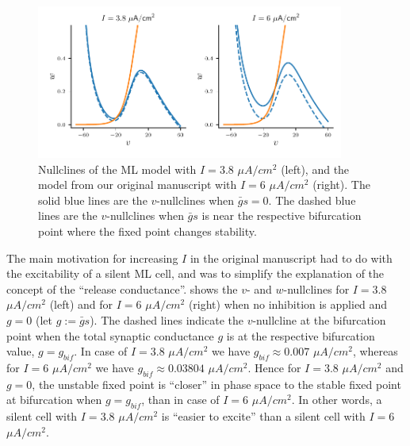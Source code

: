 \documentclass[utf8]{article}
\newcounter{point}[section]
\begin{document}
\begin{figure}[h!]
	\centering
	\includegraphics[width=0.9\textwidth]{model-changes}
	\caption{Nullclines of the \cite{bose2011} ML model with $I=3.8$ $\si{\mu A/cm^2}$ (left), and the model from our original manuscript with $I=6$ $\si{\mu A/cm^2}$ (right). The solid blue lines are the $v$-nullclines when $\bar g s=0$. The dashed blue lines are the $v$-nullclines when $\bar g s$ is near the respective bifurcation point where the fixed point changes stability.\label{fig:nullclines}}
\end{figure}

The main motivation for increasing $I$ in the original manuscript had to do with the excitability of a silent ML cell, and was to simplify the explanation of the concept of the ``release conductance''.
 shows the $v$- and $w$-nullclines for $I=3.8$ $\si{\mu A/cm^2}$ (left) and for $I=6$ $\si{\mu A/cm^2}$ (right) when no inhibition is applied and $g = 0$ (let $g:= \bar g s$).
The dashed lines indicate the $v$-nullcline at the bifurcation point when the total synaptic conductance $g$ is at the respective bifurcation value, $g=g_{bif}$.
In case of $I=3.8$ $\si{\mu A/cm^2}$ we have $g_{bif}\approx 0.007$ $\si{\mu A/cm^2}$, whereas for $I=6$ $\si{\mu A/cm^2}$ we have $g_{bif}\approx 0.03804$ $\si{\mu A/cm^2}$.
Hence for $I=3.8$ $\si{\mu A/cm^2}$ and $g=0$, the unstable fixed point is ``closer'' in phase space to the stable fixed point at bifurcation when $g=g_{bif}$, than in case of $I=6$ $\si{\mu A/cm^2}$.
In other words, a silent cell with $I=3.8$ $\si{\mu A/cm^2}$ is ``easier to excite'' than a silent cell with $I=6$ $\si{\mu A/cm^2}$.
\end{document}
